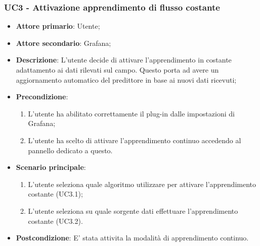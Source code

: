 \subsubsection{UC3 - Attivazione apprendimento di flusso costante}
\label{sssec:UC3}
\begin{itemize}
  \item \textbf{Attore primario}: Utente;
  \item \textbf{Attore secondario}: Grafana;
  \item \textbf{Descrizione}: L'utente decide di attivare l'apprendimento in costante adattamento ai dati rilevati sul campo. Questo porta ad avere un aggiornamento automatico del predittore in base ai nuovi dati ricevuti;
  \item \textbf{Precondizione}:
  \begin{enumerate}
    \item L'utente ha abilitato correttamente il plug-in dalle impostazioni di Grafana;
    \item L'utente ha scelto di attivare l'apprendimento continuo accedendo al pannello dedicato a questo.
  \end{enumerate}
  \item \textbf{Scenario principale}:
  \begin{enumerate}
    \item L'utente seleziona quale algoritmo utilizzare per attivare l'apprendimento costante (UC3.1);
    \item L'utente seleziona su quale sorgente dati effettuare l'apprendimento costante (UC3.2).
  \end{enumerate}
  \item \textbf{Postcondizione}: E' stata attivita la modalità di apprendimento continuo.
\end{itemize}

